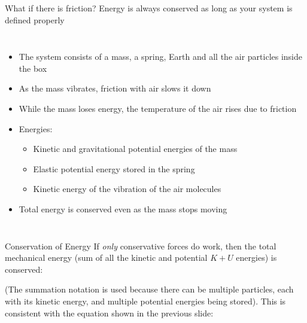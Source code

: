\documentclass[12pt,compress,aspectratio=169]{beamer}
\newcommand{\eq}[2]{\vspace{#1}{\Large\begin{displaymath}#2\end{displaymath}}}
\begin{document}
\begin{frame}{What if there is friction?}
  Energy is always conserved as long as your system is defined properly
  \begin{columns}
    \begin{itemize}
    \item The system consists of a mass, a spring, Earth and all the air
      particles inside the box
    \item As the mass vibrates, friction with air slows it down
    \item While the mass loses energy, the temperature of the air rises due to
      friction
    \item Energies:
      \begin{itemize}
      \item Kinetic and gravitational potential energies of the mass
      \item Elastic potential energy stored in the spring
      \item Kinetic energy of the vibration of the air molecules
      \end{itemize}
    \item Total energy is conserved even as the mass stops moving
    \end{itemize}
  \end{columns}
\end{frame}



\begin{frame}{Conservation of Energy}
  If \emph{only} conservative forces do work, then the total mechanical energy
  (sum of all the kinetic and potential $K+U$ energies) is conserved:

  \eq{-.1in}{
    \boxed{\sum K_i +\sum U_i =\sum K_i'+\sum U_i'}
  }

  (The summation notation is used because there can be multiple particles,
  each with its kinetic energy, and multiple potential energies being stored).
  This is consistent with the equation shown in the previous slide:

  \eq{-.2in}{
    \boxed{\Delta E=\Delta K + \Delta U =0}
  }
\end{frame}
\end{document}
